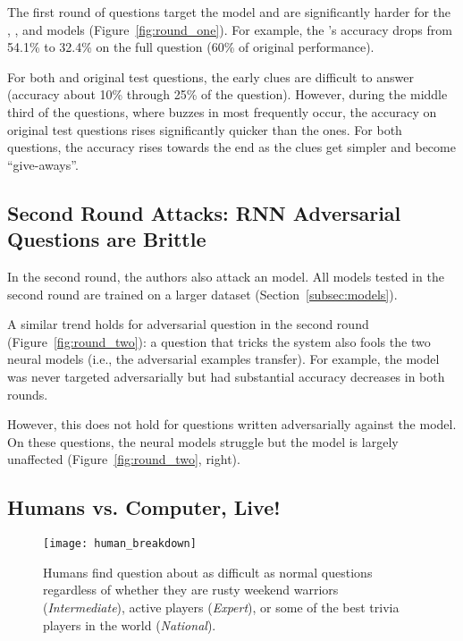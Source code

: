 The first round of \challenge{} questions target the  model
and are significantly harder for the ,
, and  models (Figure~\ref{fig:round_one}). For example,
the 's accuracy drops from 54.1\% to 32.4\% on the full question
 (60\% of original performance).

For both \challenge{} and original test questions, the early
clues are difficult to answer (accuracy about
10\% through 25\% of the question). However, during the middle third 
of the questions, where buzzes in \qb{} most
frequently occur, the accuracy on original test questions rises
significantly quicker than the \challenge{} ones. For both questions,
the accuracy rises towards the end as the clues get simpler and become
``give-aways''.

 \subsection{Second Round Attacks: RNN Adversarial Questions are Brittle}\label{subsec:two}

In the second round, the authors also attack an  model.
All models tested in the second round are trained on a larger dataset (Section~\ref{subsec:models}).

A similar trend holds for  adversarial question
in the second round (Figure~\ref{fig:round_two}): a question that tricks the  system also fools
the two neural models (i.e., the adversarial examples transfer). For example, the  model
was never targeted adversarially but had substantial
accuracy decreases in both rounds.

However, this does not hold for questions written adversarially
against the  model. On these questions, the neural models
struggle but the 
 model is largely
unaffected (Figure~\ref{fig:round_two}, right).

\subsection{Humans vs. Computer, Live!}
\label{subsec:live}

\begin{figure*}
\centering
\texttt{[image: human\_breakdown]}
\caption{Humans find \challenge{} question about as difficult as
  normal questions regardless of whether they are rusty weekend
  warriors (\textit{Intermediate}), active players (\textit{Expert}), or
  some of the best trivia players in the world (\textit{National}).}
\label{fig:human_breakdown}
\end{figure*}

